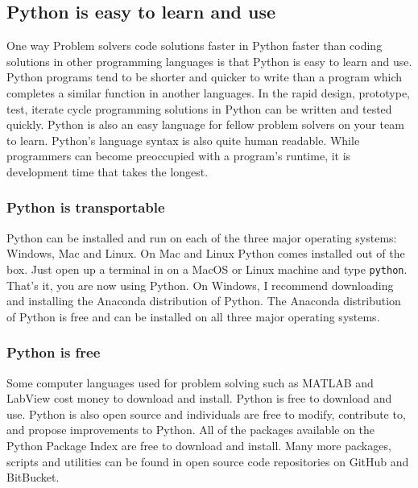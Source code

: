 \documentclass{book}
\newcommand{\passthrough}[1]{#1}
\begin{document}
    
        \hypertarget{python-is-easy-to-learn-and-use}{%
\subsection{Python is easy to learn and
use}\label{python-is-easy-to-learn-and-use}}

One way Problem solvers code solutions faster in Python faster than
coding solutions in other programming languages is that Python is easy
to learn and use. Python programs tend to be shorter and quicker to
write than a program which completes a similar function in another
languages. In the rapid design, prototype, test, iterate cycle
programming solutions in Python can be written and tested quickly.
Python is also an easy language for fellow problem solvers on your team
to learn. Python's language syntax is also quite human readable. While
programmers can become preoccupied with a program's runtime, it is
development time that takes the longest.

\hypertarget{python-is-transportable}{%
\subsubsection{Python is transportable}\label{python-is-transportable}}

Python can be installed and run on each of the three major operating
systems: Windows, Mac and Linux. On Mac and Linux Python comes installed
out of the box. Just open up a terminal in on a MacOS or Linux machine
and type \passthrough{\lstinline!python!}. That's it, you are now using
Python. On Windows, I recommend downloading and installing the Anaconda
distribution of Python. The Anaconda distribution of Python is free and
can be installed on all three major operating systems.

\hypertarget{python-is-free}{%
\subsubsection{Python is free}\label{python-is-free}}

Some computer languages used for problem solving such as MATLAB and
LabView cost money to download and install. Python is free to download
and use. Python is also open source and individuals are free to modify,
contribute to, and propose improvements to Python. All of the packages
available on the Python Package Index are free to download and install.
Many more packages, scripts and utilities can be found in open source
code repositories on GitHub and BitBucket.
\end{document}
